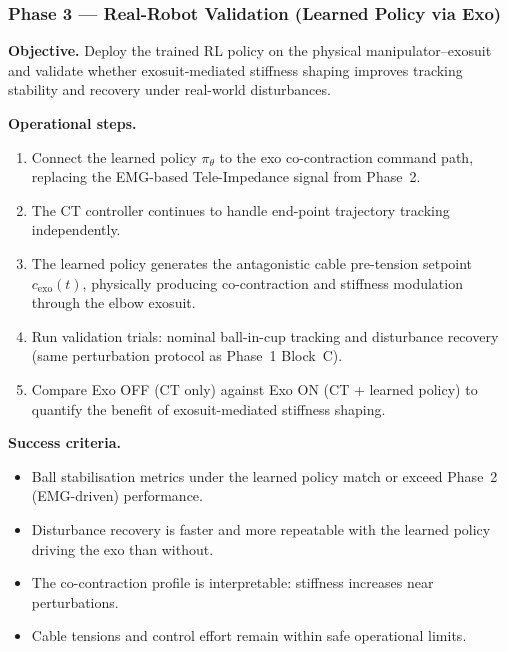 \documentclass[11pt, a4paper]{article}
\begin{document}
\subsubsection{Phase 3 --- Real-Robot Validation (Learned Policy via Exo)}
\textbf{Objective.} Deploy the trained RL policy on the physical manipulator--exosuit and validate whether exosuit-mediated stiffness shaping improves tracking stability and recovery under real-world disturbances.

\textbf{Operational steps.}
\begin{enumerate}[nosep]
  \item Connect the learned policy $\pi_\theta$ to the exo co-contraction command path, replacing the EMG-based Tele-Impedance signal from Phase~2.
  \item The CT controller continues to handle end-point trajectory tracking independently.
  \item The learned policy generates the antagonistic cable pre-tension setpoint $c_{\text{exo}}(t)$, physically producing co-contraction and stiffness modulation through the elbow exosuit.
  \item Run validation trials: nominal ball-in-cup tracking and disturbance recovery (same perturbation protocol as Phase~1 Block~C).
  \item Compare Exo OFF (CT only) against Exo ON (CT + learned policy) to quantify the benefit of exosuit-mediated stiffness shaping.
\end{enumerate}

\textbf{Success criteria.}
\begin{itemize}[nosep]
  \item Ball stabilisation metrics under the learned policy match or exceed Phase~2 (EMG-driven) performance.
  \item Disturbance recovery is faster and more repeatable with the learned policy driving the exo than without.
  \item The co-contraction profile is interpretable: stiffness increases near perturbations.
  \item Cable tensions and control effort remain within safe operational limits.
\end{itemize}
\end{document}
